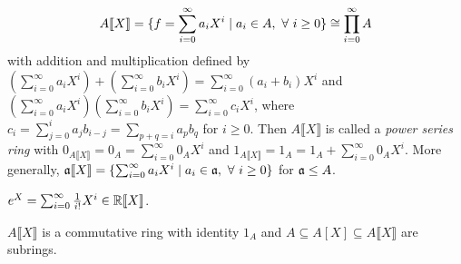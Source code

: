 \begin{definition}\label{1.65}
    \[A \llbracket X \rrbracket = \{f = \sum_{i=0}^\infty a_iX^i \mid a_i \in A, \ \forall \  i \geq 0\} \cong \prod_{i=0}^\infty A\] 
    with addition and multiplication defined by $(\sum_{i=0}^\infty a_iX^i) + (\sum_{i=0}^\infty b_iX^i) = \sum_{i=0}^\infty (a_i+b_i)X^i$ and $(\sum_{i=0}^\infty a_iX^i)(\sum_{i=0}^\infty b_iX^i) = \sum_{i=0}^\infty c_iX^i$, where $c_i = \sum_{j=0}^i a_jb_{i-j} = \sum_{p+q = i}a_pb_q$ for $i \geq 0$. Then $A\llbracket X \rrbracket$ is called a \emph{power series ring} with $0_{A\llbracket X \rrbracket} = 0_A = \sum_{i=0}^\infty 0_AX^i$ and $1_{A\llbracket X \rrbracket} = 1_A = 1_A + \sum_{i=0}^\infty 0_A X^i$. More generally, $\mathfrak{a}\llbracket X \rrbracket = \{\sum_{i=0}^\infty a_iX^i \mid a_i \in \mathfrak{a}, \ \forall \  i \geq 0\}$ for $\mathfrak{a} \leq A$.
\end{definition}

\begin{example}\label{1.66}
    $e^X = \sum_{i=0}^\infty \frac{1}{i!} X^i \in \mathbb{R} \llbracket X \rrbracket$.
\end{example}

\begin{theorem}\label{1.67}
    $A \llbracket X \rrbracket$ is a commutative ring with identity $1_A$ and $A \subseteq A[X] \subseteq A \llbracket X \rrbracket$ are subrings.
\end{theorem}

